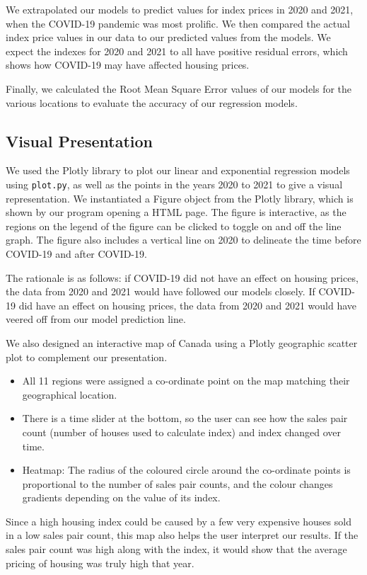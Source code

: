 \documentclass{article}
\begin{document}
We extrapolated our models to predict values for index prices in 2020 and 2021, when the COVID-19 pandemic was most prolific. We then compared the actual index price values in our data to our predicted values from the models. We expect the indexes for 2020 and 2021 to all have positive residual errors, which shows how COVID-19 may have affected housing prices.

Finally, we calculated the Root Mean Square Error values of our models for the various locations to evaluate the accuracy of our regression models.

\subsection{Visual Presentation}
We used the Plotly library to plot our linear and exponential regression models using \texttt{plot.py}, as well as the points in the years 2020 to 2021 to give a visual representation. We instantiated a Figure object from the Plotly library, which is shown by our program opening a HTML page. The figure is interactive, as the regions on the legend of the figure can be clicked to toggle on and off the line graph. The figure also includes a vertical line on 2020 to delineate the time before COVID-19 and after COVID-19.

The rationale is as follows: if COVID-19 did not have an effect on housing prices, the data from 2020 and 2021 would have followed our models closely. If COVID-19 did have an effect on housing prices, the data from 2020 and 2021 would have veered off from our model prediction line.

We also designed an interactive map of Canada using a Plotly geographic scatter plot to complement our presentation.
\begin{itemize}
\item All 11 regions were assigned a co-ordinate point on the map matching their geographical location.
\item There is a time slider at the bottom, so the user can see how the sales pair count (number of houses used to calculate index) and index changed over time.
\item Heatmap: The radius of the coloured circle around the co-ordinate points is proportional to the number of sales pair counts, and the colour changes gradients depending on the value of its index.
\end{itemize}

Since a high housing index could be caused by a few very expensive houses sold in a low sales pair count, this map also helps the user interpret our results. If the sales pair count was high along with the index, it would show that the average pricing of housing was truly high that year.
\end{document}
